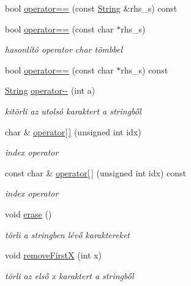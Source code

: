 \begin{DoxyCompactItemize}
bool \mbox{\hyperlink{class_string_aa4f7798884d99a0e28712d4e4044d303}{operator==}} (const \mbox{\hyperlink{class_string}{String}} \&rhs\+\_\+s) const
\item 
bool \mbox{\hyperlink{class_string_ade9af860a809548214837e33367e8835}{operator==}} (const char $\ast$rhs\+\_\+s)
\begin{DoxyCompactList}\small\item\em hasonlító operator char tömbbel \end{DoxyCompactList}\item 
bool \mbox{\hyperlink{class_string_aa50c56cbbbc9956cb359a7617f13809b}{operator==}} (const char $\ast$rhs\+\_\+s) const
\item 
\mbox{\hyperlink{class_string}{String}} \mbox{\hyperlink{class_string_a79869b69dd0106b1b6d179f760d6527a}{operator-\/-\/}} (int a)
\begin{DoxyCompactList}\small\item\em kitörli az utolsó karaktert a stringből \end{DoxyCompactList}\item 
char \& \mbox{\hyperlink{class_string_a1a7c5c39d4dafbbf8516f5058a253f1a}{operator\mbox{[}$\,$\mbox{]}}} (unsigned int idx)
\begin{DoxyCompactList}\small\item\em index operator \end{DoxyCompactList}\item 
const char \& \mbox{\hyperlink{class_string_aaa249e62641872197679cfc7c66118c0}{operator\mbox{[}$\,$\mbox{]}}} (unsigned int idx) const
\begin{DoxyCompactList}\small\item\em index operator \end{DoxyCompactList}\item 
void \mbox{\hyperlink{class_string_a3ce2ea55be9ec912bb2dbc88d461b479}{erase}} ()
\begin{DoxyCompactList}\small\item\em törli a stringben lévő karaktereket \end{DoxyCompactList}\item 
void \mbox{\hyperlink{class_string_a15c07ede44c5bcfb0920e9bf63e75670}{remove\+FirstX}} (int x)
\begin{DoxyCompactList}\small\item\em törli az első x karaktert a stringből \end{DoxyCompactList}\end{DoxyCompactItemize}


